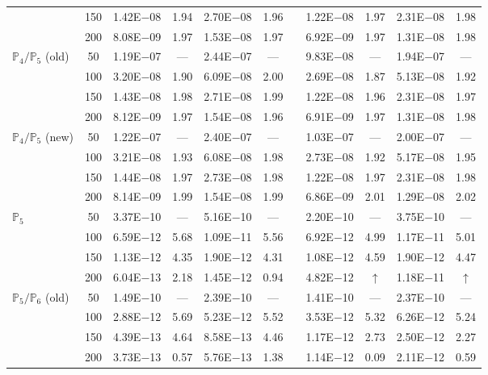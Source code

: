 \begin{table}[H]
{\begin{tabular}{@{}l c c c c c c c c c c@{}}
 & 150 & 1.42E$-$08 & 1.94  & 2.70E$-$08 & 1.96 &  & 1.22E$-$08 & 1.97 & 2.31E$-$08 & 1.98\\
 & 200 & 8.08E$-$09 & 1.97  & 1.53E$-$08 & 1.97 &  & 6.92E$-$09 & 1.97 & 1.31E$-$08 & 1.98\\
\midrule
\multirow{4}{*}{$\mathbb{P}_{4}/\mathbb{P}_{5}$ (old)}
 & 50 & 1.19E$-$07 & ---  & 2.44E$-$07 & --- &  & 9.83E$-$08 & --- & 1.94E$-$07 & ---\\
 & 100 & 3.20E$-$08 & 1.90  & 6.09E$-$08 & 2.00 &  & 2.69E$-$08 & 1.87 & 5.13E$-$08 & 1.92\\
 & 150 & 1.43E$-$08 & 1.98  & 2.71E$-$08 & 1.99 &  & 1.22E$-$08 & 1.96 & 2.31E$-$08 & 1.97\\
 & 200 & 8.12E$-$09 & 1.97  & 1.54E$-$08 & 1.96 &  & 6.91E$-$09 & 1.97 & 1.31E$-$08 & 1.98\\
\midrule
\multirow{4}{*}{$\mathbb{P}_{4}/\mathbb{P}_{5}$ (new)}
 & 50 & 1.22E$-$07 & ---  & 2.40E$-$07 & --- &  & 1.03E$-$07 & --- & 2.00E$-$07 & ---\\
 & 100 & 3.21E$-$08 & 1.93  & 6.08E$-$08 & 1.98 &  & 2.73E$-$08 & 1.92 & 5.17E$-$08 & 1.95\\
 & 150 & 1.44E$-$08 & 1.97  & 2.73E$-$08 & 1.98 &  & 1.22E$-$08 & 1.97 & 2.31E$-$08 & 1.98\\
 & 200 & 8.14E$-$09 & 1.99  & 1.54E$-$08 & 1.99 &  & 6.86E$-$09 & 2.01 & 1.29E$-$08 & 2.02\\
\midrule
\multirow{4}{*}{$\mathbb{P}_{5}$}
 & 50 & 3.37E$-$10 & ---  & 5.16E$-$10 & --- &  & 2.20E$-$10 & --- & 3.75E$-$10 & ---\\
 & 100 & 6.59E$-$12 & 5.68  & 1.09E$-$11 & 5.56 &  & 6.92E$-$12 & 4.99 & 1.17E$-$11 & 5.01\\
 & 150 & 1.13E$-$12 & 4.35  & 1.90E$-$12 & 4.31 &  & 1.08E$-$12 & 4.59 & 1.90E$-$12 & 4.47\\
 & 200 & 6.04E$-$13 & 2.18  & 1.45E$-$12 & 0.94 &  & 4.82E$-$12 & $\uparrow$ & 1.18E$-$11 & $\uparrow$\\
\midrule
\multirow{4}{*}{$\mathbb{P}_{5}/\mathbb{P}_{6}$ (old)}
 & 50 & 1.49E$-$10 & ---  & 2.39E$-$10 & --- &  & 1.41E$-$10 & --- & 2.37E$-$10 & ---\\
 & 100 & 2.88E$-$12 & 5.69  & 5.23E$-$12 & 5.52 &  & 3.53E$-$12 & 5.32 & 6.26E$-$12 & 5.24\\
 & 150 & 4.39E$-$13 & 4.64  & 8.58E$-$13 & 4.46 &  & 1.17E$-$12 & 2.73 & 2.50E$-$12 & 2.27\\
 & 200 & 3.73E$-$13 & 0.57  & 5.76E$-$13 & 1.38 &  & 1.14E$-$12 & 0.09 & 2.11E$-$12 & 0.59\\

\end{tabular}}
\end{table}

